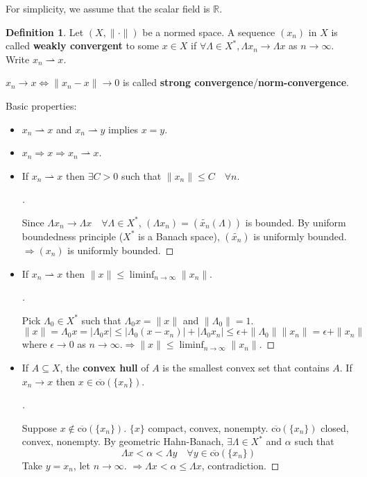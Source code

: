 \documentclass{article}
\theoremstyle{definition}
\newtheorem{dfn}{Definition}
\newenvironment{proofs}[1][\proofname]{%
  \begin{proof}[#1]$ $\par\nobreak\ignorespaces
}{%
  \end{proof}
}
\newcommand{\RR}{\mathbb R}
\newcommand{\ra}{\rightarrow}
\newcommand{\Ra}{\Rightarrow}
\begin{document}
For simplicity, we assume that the scalar field is $\RR$.

\begin{dfn}
	Let $(X, \|\cdot\|)$ be a normed space.
	A sequence $(x_n)$ in $X$ is called \textbf{weakly convergent} to some $x \in X$ if $\forall \Lambda \in X^*, \Lambda x_n \to \Lambda x$ as $n \to \infty$.
	Write $x_n \rightharpoonup x$.
\end{dfn}

$x_n \to x \Leftrightarrow \|x_n - x \| \to 0$ is called \textbf{strong convergence}/\textbf{norm-convergence}.

\par Basic properties:
\begin{itemize}
	\item $x_n \rightharpoonup x$ and $x_n \rightharpoonup y$ implies $x = y$.

	\item $x_n \Rightarrow x \Rightarrow x_n \rightharpoonup x$.

	\item If $x_n \rightharpoonup x$ then $\exists C > 0$ such that $\|x_n\| \leq C \quad \forall n$.
		\begin{proofs}
			Since $\Lambda x_n \to \Lambda x \quad \forall \Lambda \in X^*$, $(\Lambda x_n) = (\tilde{x_n}(\Lambda))$ is bounded.
			By uniform boundedness principle ($X^*$ is a Banach space), $(\tilde{x_n})$ is uniformly bounded.
			$\Rightarrow (x_n)$ is uniformly bounded.
		\end{proofs}

	\item If $x_n \rightharpoonup x$ then $\|x\| \leq \liminf_{n \to \infty} \|x_n\|$.
		\begin{proofs}
			Pick $\Lambda_0 \in X^*$ such that $\Lambda_0 x = \|x\|$ and $\|\Lambda_0\| = 1$.
			\[
				\|x\| = \Lambda_0 x = |\Lambda_0 x| \leq |\Lambda_0 (x - x_n)| + |\Lambda_0 x_n| \leq \epsilon + \|\Lambda_0 \| \|x_n \| = \epsilon + \|x_n\|
			\]
			where $\epsilon \to 0$ as $n \to \infty$.$\Ra \|x\| \leq \liminf_{n \to \infty} \|x_n\|$.
		\end{proofs}

	\item If $A \subseteq X$, the \textbf{convex hull} of $A$ is the smallest convex set that contains $A$.
		If $x_n \ra x$ then $x \in \overline{\text{co}}(\{x_n\})$.
		\begin{proofs}
			Suppose $x \notin \overline{\text{co}}(\{x_n\})$.
			$\{x\}$ compact, convex, nonempty.
			$\overline{\text{co}}(\{x_n\})$ closed, convex, nonempty.
			By geometric Hahn-Banach, $\exists \Lambda \in X^*$ and $\alpha$ such that 
			\[
				\Lambda x < \alpha < \Lambda y \quad \forall y \in \overline{\text{co}}(\{x_n\})
			\]
			Take $y = x_n$, let $n \to \infty$.
			$\Rightarrow \Lambda x < \alpha \leq \Lambda x$, contradiction.
		\end{proofs}
\end{itemize}
\end{document}
